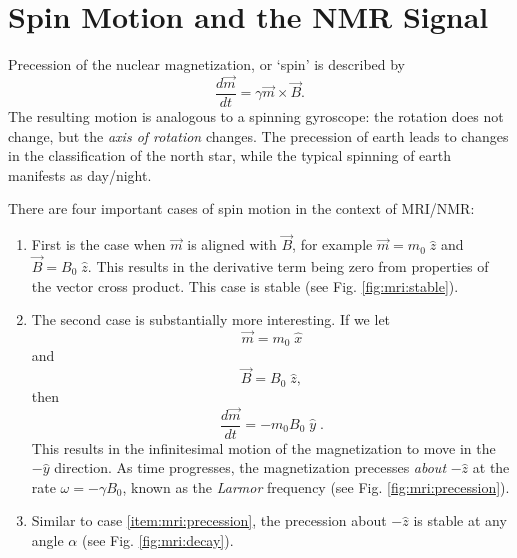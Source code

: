 \section{Spin Motion and the NMR Signal}
Precession of the nuclear magnetization, or `spin' is described by
\begin{equation}
\frac{d\vec{m}}{dt}=\gamma \vec{m} \times \vec{B}.
\end{equation}
The resulting motion is analogous to a spinning gyroscope: the rotation does not change, but the \textit{axis of rotation} changes. The precession of earth leads to changes in the classification of the north star, while the typical spinning of earth manifests as day/night.

There are four important cases of spin motion in the context of MRI/NMR:
\begin{enumerate}
	\item First is the case when $\vec{m}$ is aligned with $\vec{B}$, for example $\vec{m} = m_0\; \hat{z}$ and $\vec{B}  = B_0\; \hat{z}$. This results in the derivative term being zero from properties of the vector cross product. This case is stable (see Fig. \ref{fig:mri:stable}).

\item \label{item:mri:precession}The second case is substantially more interesting. If we let 
\begin{equation}
\vec{m} = m_0\; \hat{x}
\end{equation} and \begin{equation}
\vec{B}  = B_0\; \hat{z} ,
\end{equation} then \begin{equation}
 \frac{d\vec{m}}{dt} = - m_0B_0\;\hat{y}\; .
 \end{equation} 
This results in the infinitesimal motion of the magnetization to move in the $-\hat{y}$ direction. As time progresses, the magnetization precesses \textit{about} $-\hat{z}$ at the rate $\omega = -\gamma B_0$, known as the \textit{Larmor} frequency (see Fig. \ref{fig:mri:precession}).
\item Similar to case \ref{item:mri:precession}, the precession about $-\hat{z}$ is stable at any angle $\alpha$ (see Fig. \ref{fig:mri:decay}).


\end{enumerate}
